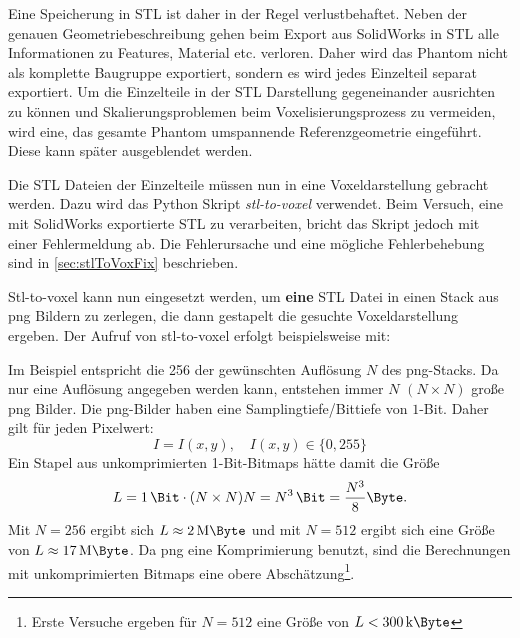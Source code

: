 Eine Speicherung in STL ist daher in der Regel verlustbehaftet. Neben der genauen Geometriebeschreibung gehen beim Export aus SolidWorks in STL alle Informationen zu Features, Material etc. verloren. Daher wird das Phantom nicht als komplette Baugruppe exportiert, sondern es wird jedes Einzelteil separat exportiert. Um die Einzelteile in der STL Darstellung gegeneinander ausrichten zu können und Skalierungsproblemen beim Voxelisierungsprozess zu vermeiden, wird eine, das gesamte Phantom umspannende Referenzgeometrie eingeführt. Diese kann später ausgeblendet werden.

Die STL Dateien der Einzelteile müssen nun in eine Voxeldarstellung gebracht werden. Dazu wird das Python Skript \textit{stl-to-voxel} \cite{stlToVox} verwendet. Beim Versuch, eine mit SolidWorks exportierte STL zu verarbeiten, bricht das Skript jedoch mit einer Fehlermeldung ab. Die Fehlerursache und eine mögliche Fehlerbehebung sind in \autoref{sec:stlToVoxFix} beschrieben.

Stl-to-voxel kann nun eingesetzt werden, um \textbf{eine} STL Datei in einen Stack aus png Bildern zu zerlegen, die dann gestapelt die gesuchte Voxeldarstellung ergeben.
Der Aufruf von stl-to-voxel erfolgt beispielsweise mit:

Im Beispiel entspricht die 256 der gewünschten Auflösung $N$ des png-Stacks. Da nur eine Auflösung angegeben werden kann, entstehen immer $N$ $(N\times N)$ große png Bilder. Die png-Bilder haben eine Samplingtiefe/Bittiefe von $1$-Bit. Daher gilt für jeden Pixelwert:
\begin{equation}
	I = I(x,y) , \quad I(x,y) \in \{0, 255\}
\end{equation}
Ein Stapel aus unkomprimierten 1-Bit-Bitmaps hätte damit die Größe
\begin{equation}
	L=\SI{1}{\Bit} \cdot (N \times N) N = N^3 \,\SI{}{\Bit} = \frac{N^3}{8} \SI{}{\Byte}.
\end{equation}
Mit $N=256$ ergibt sich $L\approx \SI{2}{\mega\Byte}$ und mit $N=512$ ergibt sich eine Größe von $L\approx \SI{17}{\mega\Byte}$. Da png eine Komprimierung benutzt, sind die Berechnungen mit unkomprimierten Bitmaps eine obere Abschätzung\footnote{Erste Versuche ergeben für $N=512$ eine Größe von $L<\SI{300}{\kilo\Byte}$}.

